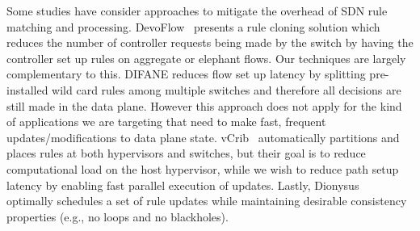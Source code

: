 Some studies have consider approaches to mitigate the overhead of SDN
rule matching and processing. DevoFlow~\cite{devoflow} presents
a rule cloning solution which reduces the number of controller
requests being made by the switch by having the controller set up
rules on aggregate or elephant flows. Our techniques are largely
complementary to this. 
DIFANE \cite{difane} reduces flow set up latency by splitting
pre-installed wild card rules among multiple switches and therefore
all decisions are still made in the data plane.  However this approach does not
apply for the kind of applications we are targeting that need to make fast,
frequent updates/modifications to data plane state. 
vCrib~\cite{minlanvcrib} automatically partitions and places rules at both hypervisors and
switches, but their goal is to reduce computational load on the
host hypervisor, while we wish to reduce path setup latency by enabling fast
parallel execution of updates.
Lastly, Dionysus~\cite{dionysus} optimally schedules a set of rule updates 
while maintaining desirable consistency properties (e.g., no loops and no
blackholes). 


